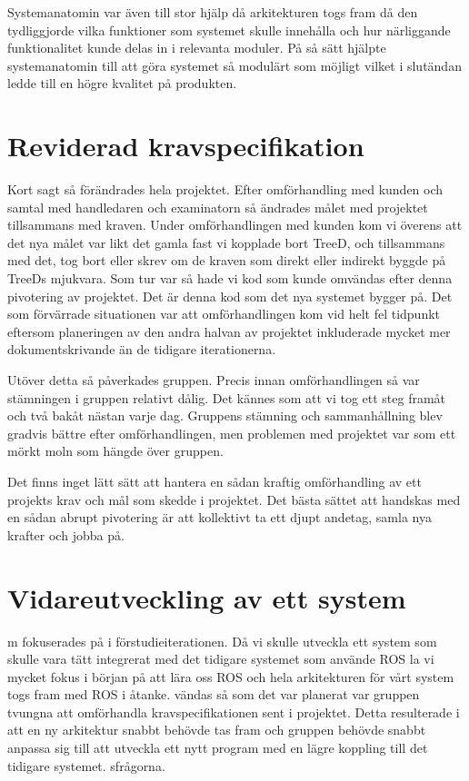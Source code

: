 Systemanatomin var även till stor hjälp då arkitekturen togs fram då den tydliggjorde vilka funktioner som systemet skulle innehålla och hur närliggande funktionalitet kunde delas in i relevanta moduler. På så sätt hjälpte systemanatomin till att göra systemet så modulärt som möjligt vilket i slutändan ledde till en högre kvalitet på produkten.

\section{Reviderad kravspecifikation}
Kort sagt så förändrades hela projektet. Efter omförhandling med kunden och samtal med handledaren och examinatorn så ändrades målet med projektet tillsammans med kraven. Under omförhandlingen med kunden kom vi överens att det nya målet var likt det gamla fast vi kopplade bort TreeD, och tillsammans med det, tog bort eller skrev om de kraven som direkt eller indirekt byggde på TreeDs mjukvara. Som tur var så hade vi kod som kunde omvändas efter denna pivotering  
av projektet. Det är denna kod som det nya systemet bygger på. Det som förvärrade situationen var att omförhandlingen kom vid helt fel tidpunkt eftersom planeringen av den andra halvan av projektet inkluderade mycket mer dokumentskrivande än de tidigare iterationerna.

Utöver detta så påverkades gruppen. Precis innan omförhandlingen så var stämningen i gruppen relativt dålig. Det kännes som att vi tog ett steg framåt och två bakåt nästan varje dag. Gruppens stämning och sammanhållning blev gradvis bättre efter omförhandlingen, men problemen med projektet var som ett mörkt moln som hängde över gruppen.

Det finns inget lätt sätt att hantera en sådan kraftig omförhandling av ett projekts krav och mål som skedde i projektet. Det bästa sättet att handskas med en sådan abrupt pivotering är att kollektivt ta ett djupt andetag, samla nya krafter och jobba på.

\section{Vidareutveckling av ett system}
m fokuserades på i förstudieiterationen. Då vi skulle utveckla ett system som skulle vara tätt integrerat med det tidigare systemet som använde ROS la vi mycket fokus i början på att lära oss ROS och hela arkitekturen för vårt system togs fram med ROS i åtanke.
vändas så som det var planerat var gruppen tvungna att omförhandla kravspecifikationen sent i projektet. Detta resulterade i att en ny arkitektur snabbt behövde tas fram och gruppen behövde snabbt anpassa sig till att utveckla ett nytt program med en lägre koppling till det tidigare systemet.
sfrågorna.

